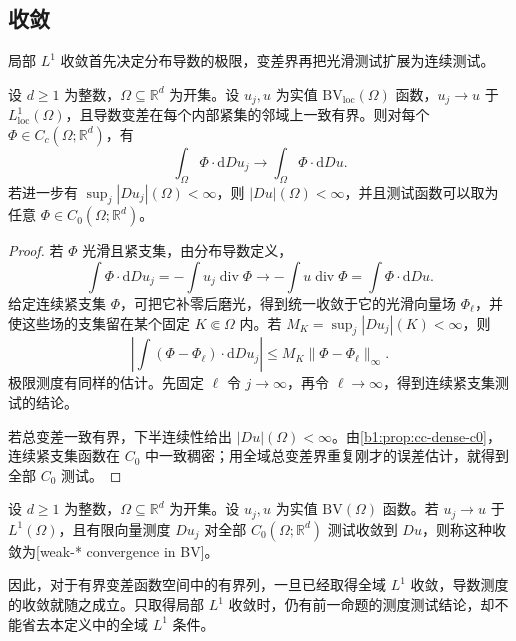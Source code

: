 \subsection{\WeakStar{}收敛}
\label{b1:subsec:270204}

局部 \(L^1\) 收敛首先决定分布导数的极限，变差界再把光滑测试扩展为连续测试。

\begin{proposition}\label{b1:prop:bv-distributional-weak-star}
设 \(d\ge1\) 为整数，\(\Omega\subseteq\mathbb R^d\) 为开集。设 \(u_j,u\) 为实值 \(\mathrm{BV}_{\mathrm{loc}}(\Omega)\) 函数，\(u_j\to u\) 于
\(L^1_{\mathrm{loc}}(\Omega)\)，且导数变差在每个内部紧集的邻域上一致有界。则对每个
\(\Phi\in C_c(\Omega;\mathbb R^d)\)，有
\[
 \int_\Omega\Phi\cdot\mathrm dDu_j
 \longrightarrow\int_\Omega\Phi\cdot\mathrm dDu.
\]
若进一步有 \(\sup_j|Du_j|(\Omega)<\infty\)，则 \(|Du|(\Omega)<\infty\)，并且测试函数可以取为任意 \(\Phi\in C_0(\Omega;\mathbb R^d)\)。
\end{proposition}
\begin{proof}
若 \(\Phi\) 光滑且紧支集，由分布导数定义，
\[
 \int\Phi\cdot\mathrm dDu_j
 =-\int u_j\operatorname{div}\Phi
 \longrightarrow-\int u\operatorname{div}\Phi
 =\int\Phi\cdot\mathrm dDu.
\]
给定连续紧支集 \(\Phi\)，可把它补零后磨光，得到统一收敛于它的光滑向量场 \(\Phi_\ell\)，并使这些场的支集留在某个固定
\(K\Subset\Omega\) 内。若 \(M_K=\sup_j|Du_j|(K)<\infty\)，则
\[
 \left|\int(\Phi-\Phi_\ell)\cdot\mathrm dDu_j\right|
 \leq M_K\|\Phi-\Phi_\ell\|_\infty.
\]
极限测度有同样的估计。先固定 \(\ell\) 令 \(j\to\infty\)，再令
\(\ell\to\infty\)，得到连续紧支集测试的结论。

若总变差一致有界，下半连续性给出 \(|Du|(\Omega)<\infty\)。由\cref{b1:prop:cc-dense-c0}，连续紧支集函数在 \(C_0\) 中一致稠密；用全域总变差界重复刚才的误差估计，就得到全部 \(C_0\) 测试。
\end{proof}

\begin{definition}\label{b1:def:bv-weak-star-convergence}
设 \(d\ge1\) 为整数，\(\Omega\subseteq\mathbb R^d\) 为开集。设 \(u_j,u\) 为实值 \(\mathrm{BV}(\Omega)\) 函数。若 \(u_j\to u\) 于 \(L^1(\Omega)\)，且有限向量测度 \(Du_j\) 对全部 \(C_0(\Omega;\mathbb R^d)\) 测试\WeakStar{}收敛到 \(Du\)，则称这种收敛为[weak-* convergence in BV]。
\end{definition}

因此，对于有界变差函数空间中的有界列，一旦已经取得全域 \(L^1\) 收敛，导数测度的\WeakStar{}收敛就随之成立。只取得局部 \(L^1\) 收敛时，仍有前一命题的测度测试结论，却不能省去本定义中的全域 \(L^1\) 条件。

